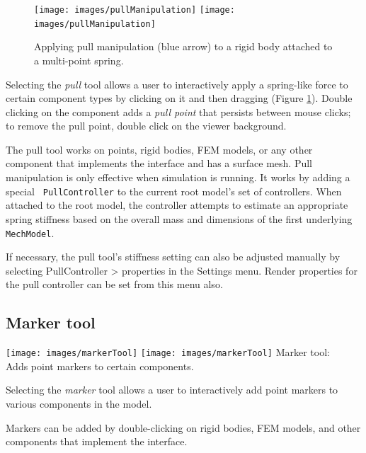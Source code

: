 \documentclass{article}
\begin{document}
\begin{figure}[h]
\begin{center}
\iflatexml
\texttt{[image: images/pullManipulation]}
\else
\texttt{[image: images/pullManipulation]}
\fi
\end{center}
\caption{Applying pull manipulation (blue arrow) to a rigid body 
attached to a multi-point spring.}%
\label{PullManipulationFig}
\end{figure}

Selecting the {\it pull} tool allows a user to interactively apply a
spring-like force to certain component types by clicking on it and
then dragging (Figure \ref{PullManipulationFig}). Double clicking on
the component adds a {\it pull point} that persists between mouse
clicks; to remove the pull point, double click on the viewer
background.

The pull tool works on points, rigid bodies, FEM models, or any other
component that implements the
 interface and
has a surface mesh. Pull manipulation is only effective when
simulation is running.  It works by adding a special {\tt
PullController} to the current root model's set of controllers. When
attached to the root model, the controller attempts to estimate an
appropriate spring stiffness based on the overall mass and dimensions
of the first underlying {\tt MechModel}.

If necessary, the pull tool's stiffness setting can also be adjusted
manually by selecting {\sf PullController > properties} in the {\sf
Settings} menu.  Render properties for the pull controller can be set
from this menu also.

\subsection{Marker tool}
\label{MarkerTool}

\vspace{\parskip}
\iflatexml
\phantom{.}\texttt{[image: images/markerTool]}
\else
\texttt{[image: images/markerTool]}
\fi
{\sf Marker tool:}\\
Adds point markers to certain components.

Selecting the {\it marker} tool allows a user to interactively add
point markers to various components in the model.

Markers can be added by double-clicking on rigid bodies, FEM models,
and other components that implement the
 interface.
\end{document}

